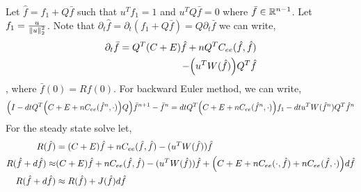 \documentclass{article}[draft]
\begin{document}
Let $\hat{f} = f_1 + Q\bar{f}$ such that $u^T f_1 = 1$ and $u^T Q\bar{f}=0$ where $\bar{f}\in \mathbb{R}^{n-1}$.  Let $f_1= \frac{u}{\left\lVert u\right\rVert_2^2}$. Note that $\partial_t \hat{f} = \partial_t (f_1 + Q\bar{f} ) = Q\partial_t \bar{f}$ we can write, 
\begin{align*}
	\partial_t \bar{f} = Q^T(C+E)\hat{f} + n Q^T C_{ee}(\hat{f}, \hat{f}) \\
	- \of{u^T W(\hat{f})} Q^T\hat{f}
\end{align*}, where $\bar{f}(0) = Rf(0)$. 
For backward Euler method, we can write, 
\begin{align*}
	\of{I - dtQ^T \of{C+ E + n C_{ee}(\hat{f}^{n},\cdot)} Q} \bar{f}^{n+1} -\bar{f}^{n}= dtQ^T\of{C+E + n C_{ee}(\hat{f}^{n},\cdot)}f_1 -dt u^T W(\hat{f}^{n}) Q^T \hat{f}^{n}
 \end{align*}
For the steady state solve let, 
\begin{align*}
R(\hat{f}) &= (C+E)\hat{f} + nC_{ee}(\hat{f},\hat{f}) -(u^TW(\hat{f})) \hat{f}\\
R(\hat{f} + d\hat{f}) \approx &(C+E)\hat{f} + nC_{ee}(\hat{f}, \hat{f}) -(u^TW(\hat{f}))\hat{f} 
						+ \of{C+ E + nC_{ee}(\cdot, \hat{f}) + nC_{ee}(\hat{f},\cdot)} d\hat{f} \\
R(\hat{f} + d\hat{f}) &\approx R(\hat{f}) + J(\hat{f}) d\hat{f}
\end{align*}
%
\end{document}
